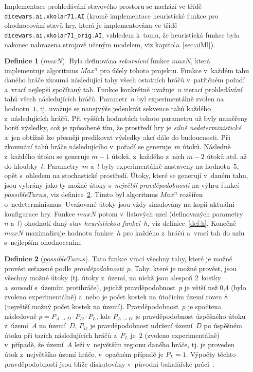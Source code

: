 \documentclass[11pt, a4paper]{article}
\theoremstyle{definition}
\newtheorem{definition}{Definice}[section]
\begin{document}
Implementace prohledávání stavového prostoru se nachází ve třídě
\texttt{dicewars.ai.xkolar71.AI} (kromě implementace heuristické funkce
pro ohodnocování stavů hry, která je implementována ve třídě
\texttt{dicewars.ai.xkolar71\_orig.AI}, vzhledem k~tomu, že heuristická funkce
byla nakonec nahrazena strojově učeným modelem, viz kapitola~\ref{sec:aiMl}).

\medskip

\begin{definition}[$ maxN $]
Byla definována \emph{rekursívní} funkce $ maxN $, která implementuje
algoritmus $ Max^n $ pro účely tohoto projektu. Funkce v~každém tahu daného
hráče zkoumá následující tahy všech ostatních hráčů v~patřičném pořadí
a~vrací nejlepší spočítaný tah. Funkce konkrétně uvažuje~$ n $ iterací
prohledávání tahů všech následujících hráčů. Parametr~$ n $ byl
experimentálně zvolen na hodnotu~$ 1 $, tj. uvažuje se nanejvýše jedenkrát
sekvence tahů každého z~následujících hráčů. Při vyšších hodnotách tohoto
parametru už byly naměřeny horší výsledky, což je způsobené tím, že prostředí
hry je \emph{silně nedeterministické} a~jen obtížně lze přesněji predikovat
výsledky akcí dále do budoucnosti. Při zkoumání tahů hráče následujícího
v~pořadí se generuje~$ m $ útoků. Následně z~každého útoku se generuje
$ m - 1 $ útoků, z~každého z~nich $ m - 2 $ útoků atd. až do hloubky~$ l $.
Parametry~$ m $ a~$ l $ byly experimentálně nastaveny na hodnotu~5, opět
s~ohledem na stochastické prostředí. Útoky, které se generují v~daném
tahu, jsou vybrány jako ty možné útoky s~\emph{největší pravděpodobností} na
výhru funkcí $ possibleTurns $, viz definice~\ref{def:possTurns}. Tímto
byl algoritmus $ Max^n $ rozšířen o~nedeterminismus. Uvažované útoky jsou
vždy simulovány na kopii aktuální konfigurace hry. Funkce $ maxN $ potom
v~listových uzel (definovaných parametry~$ n $ a~$ l $) ohodnotí daný stav
\emph{heuristickou funkcí}~$ h $, viz definice~\ref{def:h}. Konečně $ maxN $
maximalizuje hodnotu funkce~$ h $ pro každého z~hráčů a~vrací tah do uzlu
s~nejlepším ohodnocením.
\end{definition}

\medskip

\begin{definition}[$ possibleTurns $]
\label{def:possTurns}
Tato funkce vrací všechny tahy, které je možné provést seřazené podle
\emph{pravděpodobnosti}~$ p $. Tahy, které je možné provést, jsou
všechny možné útoky (tj. útoky z~území, na nichž jsou alespoň 2~kostky
a~sousedí s~územím protihráče), jejichž pravděpodobnost~$ p $
je větší než 0,4 (bylo zvoleno experimentálně) a~nebo je počet kostek
na útočícím území roven 8 (největší možný počet kostek na území).
Pravděpodobnost~$ p $ je spočtena následovně $ p = P_{A \rightarrow D}
\cdot P_D \cdot P_L $, kde $ P_{A \rightarrow D} $ je pravděpodobnost
úspěšného útoku z~území~$ A $ na území~$ D $, $ P_D $ je pravděpodobnost
udržení území~$ D $ po úspěšném útoku při tazích následujících hráčů
a~$ P_L $ je~2 (zvoleno experimentálně) v~případě, že území~$ A $ leží
v~největším regionu daného hráče, tj. je proveden útok z~největšího území
hráče, v~opačném případě je $ P_L = 1 $. Výpočty těchto pravděpodobností
jsou blíže diskutovány v~původní bakalářské práci~\cite{turecekBP}.
\end{definition}
\end{document}
